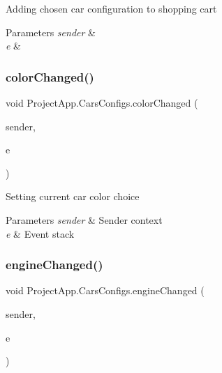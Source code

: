 Adding chosen car configuration to shopping cart 


\begin{DoxyParams}{Parameters}
{\em sender} & \\
\hline
{\em e} & \\
\hline
\end{DoxyParams}
\mbox{\label{class_project_app_1_1_cars_configs_a4bcd76012f796c9493f0a0a25a176dc8}} 
\subsubsection{\texorpdfstring{color\+Changed()}{colorChanged()}}
{\footnotesize\ttfamily void Project\+App.\+Cars\+Configs.\+color\+Changed (\begin{DoxyParamCaption}\item[{object}]{sender,  }\item[{Selection\+Changed\+Event\+Args}]{e }\end{DoxyParamCaption})\hspace{0.3cm}{\ttfamily [private]}}



Setting current car color choice 


\begin{DoxyParams}{Parameters}
{\em sender} & Sender context\\
\hline
{\em e} & Event stack\\
\hline
\end{DoxyParams}
\mbox{\label{class_project_app_1_1_cars_configs_a9ab87e077a632aaa4049dc1fb690cbe0}} 
\subsubsection{\texorpdfstring{engine\+Changed()}{engineChanged()}}
{\footnotesize\ttfamily void Project\+App.\+Cars\+Configs.\+engine\+Changed (\begin{DoxyParamCaption}\item[{object}]{sender,  }\item[{Selection\+Changed\+Event\+Args}]{e }\end{DoxyParamCaption})\hspace{0.3cm}{\ttfamily [private]}}



